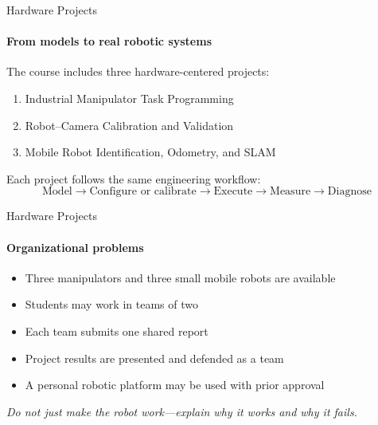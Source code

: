 \documentclass[aspectratio=169]{beamer}
\begin{document}
\begin{frame}[t]{Hardware Projects}
    \framesubtitle{From models to real robotic systems}
    \small

    The course includes three hardware-centered projects:
    \begin{enumerate}
        \item Industrial Manipulator Task Programming
        \item Robot--Camera Calibration and Validation
        \item Mobile Robot Identification, Odometry, and SLAM
    \end{enumerate}

    Each project follows the same engineering workflow:
    \[
        \text{Model}
        \rightarrow
        \text{Configure or calibrate}
        \rightarrow
        \text{Execute}
        \rightarrow
        \text{Measure}
        \rightarrow
        \text{Diagnose}
    \]

\end{frame}

\begin{frame}[t]{Hardware Projects}
\framesubtitle{Organizational problems}
    \begin{itemize}
        \item Three manipulators and three small mobile robots are available
        \item Students may work in teams of two
        \item Each team submits one shared report
        \item Project results are presented and defended as a team
        \item A personal robotic platform may be used with prior approval
    \end{itemize}

    \medskip
    \centering
    \textit{Do not just make the robot work---explain why it works
    and why it fails.}
\end{frame}
\end{document}
